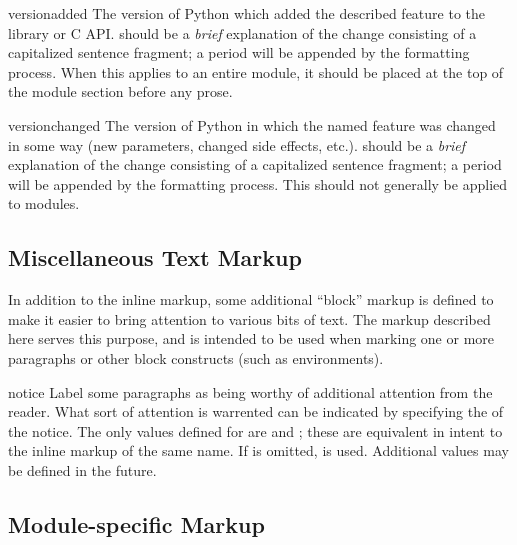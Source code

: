 \documentclass{howto}
\begin{document}
    \begin{macrodesc}{versionadded}{}
      The version of Python which added the described feature to the
      library or C API.   should be a \emph{brief}
      explanation of the change consisting of a capitalized sentence
      fragment; a period will be appended by the formatting process.
      When this applies to an entire module, it should be placed at
      the top of the module section before any prose.
    \end{macrodesc}

    \begin{macrodesc}{versionchanged}{}
      The version of Python in which the named feature was changed in
      some way (new parameters, changed side effects, etc.).
       should be a \emph{brief} explanation of the
      change consisting of a capitalized sentence fragment; a
      period will be appended by the formatting process.  This should
      not generally be applied to modules.
    \end{macrodesc}


  \subsection{Miscellaneous Text Markup \label{misc-text-markup}}

  In addition to the inline markup, some additional ``block'' markup
  is defined to make it easier to bring attention to various bits of
  text.  The markup described here serves this purpose, and is
  intended to be used when marking one or more paragraphs or other
  block constructs (such as  environments).

  \begin{envdesc}{notice}{}
    Label some paragraphs as being worthy of additional attention from
    the reader.  What sort of attention is warrented can be indicated
    by specifying the  of the notice.  The only values
    defined for  are  and ; these
    are equivalent in intent to the inline markup of the same name.
    If  is omitted,  is used.  Additional values
    may be defined in the future.
  \end{envdesc}


  \subsection{Module-specific Markup \label{module-markup}}
\end{document}
